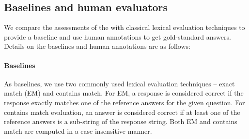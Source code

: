 



\subsection{Baselines and human evaluators \label{sec:experiments:baselineandhumanannotation}}

We compare the assessments of the \judgemodels with classical lexical evaluation techniques to provide a baseline and use human annotations to get gold-standard answers. Details on the baselines and human annotations are as follows:

\paragraph{Baselines}
As baselines, we use two commonly used lexical evaluation techniques  -- exact match (EM) and contains match.
For EM, a response is considered correct if the response exactly matches one of the reference answers for the given question.
For contains match evaluation, an answer is considered correct if at least one of the reference answers is a sub-string of the response string.
Both EM and contains match are computed in a case-insensitive manner.
%
%

